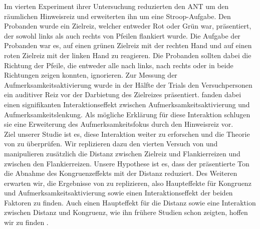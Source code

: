 Im vierten Experiment ihrer Untersuchung reduzierten \parencite{weinbach2012relationship} den ANT um den räumlichen Hinweisreiz und erweiterten ihn um eine Stroop-Aufgabe. Den Probanden wurde ein Zielreiz, welcher entweder Rot oder Grün war, präsentiert, der sowohl links als auch rechts von Pfeilen flankiert wurde. Die Aufgabe der Probanden war es, auf einen grünen Zielreiz mit der rechten Hand und auf einen roten Zielreiz mit der linken Hand zu reagieren. Die Probanden sollten dabei die Richtung der Pfeile, die entweder alle nach links, nach rechts oder in beide Richtungen zeigen konnten, ignorieren. Zur Messung der Aufmerksamkeitsaktivierung wurde in der Hälfte der Trials den Versuchpersonen ein auditiver Reiz vor der Darbietung des Zielreizes präsentiert. \textcite{weinbach2012relationship} fanden dabei einen signifikanten Interaktionseffekt zwischen Aufmerksamkeitsaktivierung und Aufmerksamkeitslenkung. Als mögliche Erklärung für diese Interaktion schlugen sie eine Erweiterung des Aufmerksamkeitsfokus durch den Hinweisreiz vor.\\
Ziel unserer Studie ist es, diese Interaktion weiter zu erforschen und die Theorie von \textcite{weinbach2012relationship} zu überprüfen. Wir replizieren dazu den vierten Versuch von \textcite{weinbach2012relationship} und manipulieren zusätzlich die Distanz zwischen Zielreiz und Flankierreizen und  zwischen den Flankierreizen. Unsere Hypothese ist es, dass der präsentierte Ton die Abnahme des Kongruenzeffekts mit der Distanz reduziert. Des Weiteren erwarten wir, die Ergebnisse von \textcite{weinbach2012relationship} zu replizieren, also Haupteffekte für Kongruenz und Aufmerksamkeitsaktivierung sowie einen Interaktionseffekt der beiden Faktoren zu finden. Auch einen Haupteffekt für die Distanz sowie eine Interaktion zwischen Distanz und Kongruenz, wie ihn frühere Studien schon zeigten, hoffen wir zu finden \cite{eriksen1974effects}.